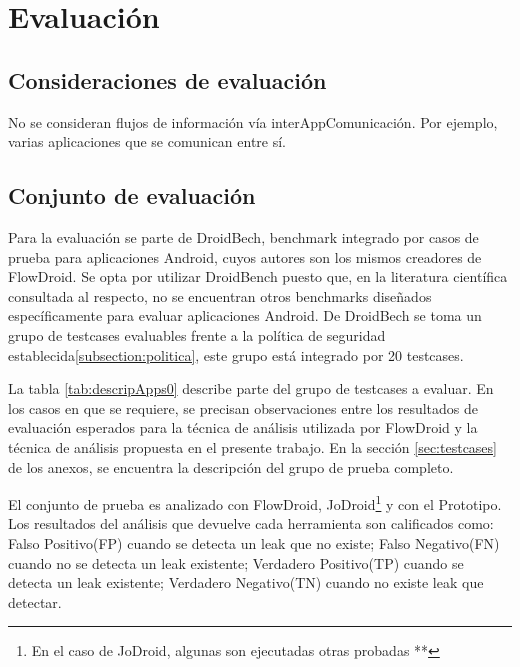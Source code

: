 \label{ch:evaluacion}
\chapter{Evaluación}

\section{Consideraciones de evaluación}
No se consideran flujos de información vía interAppComunicación. Por ejemplo,
varias aplicaciones que se comunican entre sí.

\section{Conjunto de evaluación}
Para la evaluación se parte de DroidBech\cite{DroidBenchBenchmarks}, benchmark
integrado por casos de prueba para aplicaciones Android, cuyos autores son los
mismos creadores de FlowDroid. Se opta por utilizar DroidBench puesto que, en la
literatura científica consultada al respecto, no se encuentran otros benchmarks
diseñados específicamente para evaluar aplicaciones Android.\newline 
De DroidBech se toma un grupo de testcases evaluables frente a la política de
seguridad establecida\ref{subsection:politica}, este grupo está integrado por 20
testcases.

La tabla \ref{tab:descripApps0} describe parte del grupo de testcases a
evaluar. En los casos en que se requiere, se precisan observaciones entre los
resultados de evaluación esperados para la técnica de análisis utilizada por
FlowDroid y la técnica de análisis propuesta en el presente trabajo. En
la sección \ref{sec:testcases} de los anexos, se encuentra la
descripción del grupo de prueba completo.

El conjunto de prueba es analizado con FlowDroid, JoDroid\footnote{En el caso de
JoDroid, algunas son ejecutadas otras probadas **} y con el Prototipo. Los
resultados del análisis que devuelve cada herramienta son calificados como:
Falso Positivo(FP) cuando se detecta un leak que no existe; Falso Negativo(FN)
cuando no se detecta un leak existente; Verdadero Positivo(TP) cuando se detecta
un leak existente; Verdadero Negativo(TN) cuando no existe leak que detectar.

